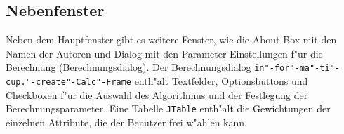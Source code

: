 \subsection{Nebenfenster}
Neben dem Hauptfenster gibt es weitere Fenster, wie die About-Box mit den Namen der Autoren und Dialog mit den Parameter-Einstellungen f"ur die Berechnung (Berechnungsdialog). Der Berechnungsdialog \texttt{in"-for"-ma"-ti"-cup."-create"-Calc"-Frame} enth"alt Textfelder, Optionsbuttons und Checkboxen f"ur die Auswahl des Algorithmus und der Festlegung der Berechnungsparameter. Eine Tabelle \texttt{JTable} enth"alt die Gewichtungen der einzelnen Attribute, die der Benutzer frei w"ahlen kann. 
